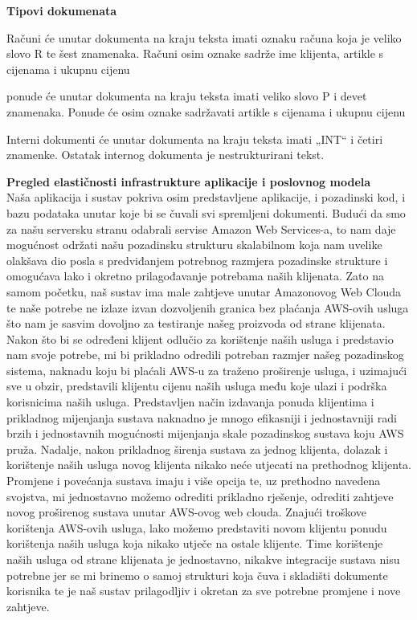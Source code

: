 	\medskip
	\textbf{Tipovi dokumenata}
	
		\begin{packed_item}
			
			
			\item{} Računi će unutar dokumenta na kraju teksta imati oznaku  računa koja je veliko slovo R te šest znamenaka. Računi osim oznake sadrže ime klijenta, artikle s cijenama i ukupnu cijenu
			\item{} ponude će unutar dokumenta na kraju teksta imati veliko slovo P i devet znamenaka. Ponude će osim oznake sadržavati artikle s cijenama i ukupnu cijenu
			\item{} Interni dokumenti će unutar dokumenta na kraju teksta imati „INT“ i četiri znamenke. Ostatak internog dokumenta je nestrukturirani tekst.
			
		\end{packed_item}
	
		\medskip
		\textbf{Pregled elastičnosti infrastrukture aplikacije i poslovnog modela}
			\\
		Naša aplikacija i sustav pokriva osim predstavljene aplikacije, i pozadinski kod, i bazu podataka
			unutar koje bi se čuvali svi spremljeni dokumenti. Budući da smo za našu serversku stranu odabrali servise Amazon Web Services-a, to nam daje mogućnost održati našu pozadinsku strukturu skalabilnom koja nam uvelike olakšava dio posla s predviđanjem potrebnog razmjera pozadinske strukture i omogućava lako i okretno prilagođavanje potrebama naših klijenata. Zato na samom početku, naš sustav ima male zahtjeve unutar Amazonovog Web Clouda te naše potrebe ne izlaze izvan dozvoljenih granica bez plaćanja AWS-ovih usluga što nam je sasvim dovoljno za testiranje našeg proizvoda od strane klijenata. Nakon što bi se određeni klijent odlučio za korištenje naših usluga i predstavio nam svoje potrebe, mi bi prikladno odredili potreban razmjer našeg pozadinskog sistema, naknadu koju bi plaćali AWS-u za traženo proširenje usluga, i uzimajući sve u obzir, predstavili klijentu cijenu naših usluga među koje ulazi i podrška korisnicima naših usluga. Predstavljen način izdavanja ponuda klijentima i prikladnog mijenjanja sustava naknadno je mnogo efikasniji i jednostavniji radi brzih i jednostavnih mogućnosti mijenjanja skale pozadinskog sustava koju AWS pruža. Nadalje, nakon prikladnog širenja sustava za jednog klijenta, dolazak i korištenje naših usluga novog klijenta nikako neće utjecati na prethodnog klijenta. Promjene i povećanja sustava imaju i više opcija te, uz prethodno navedena svojstva, mi jednostavno možemo odrediti prikladno rješenje, odrediti zahtjeve novog proširenog sustava unutar AWS-ovog web clouda. Znajući troškove korištenja AWS-ovih usluga, lako možemo predstaviti novom klijentu ponudu korištenja naših usluga koja nikako utječe na ostale klijente. Time korištenje naših usluga od strane klijenata je jednostavno, nikakve integracije sustava nisu potrebne jer se mi brinemo o samoj strukturi koja čuva i skladišti dokumente korisnika te je naš sustav prilagodljiv i okretan za sve potrebne promjene i nove zahtjeve.
		
